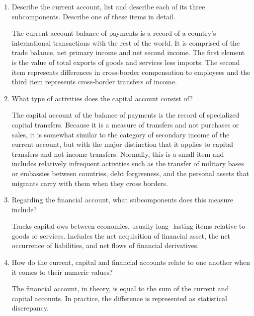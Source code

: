 \documentclass[12pt]{article}
\begin{document}
\begin{enumerate}[1)]
	
	\item Describe the current account, list and describe each of its three subcomponents. Describe one of these items in detail. 
	
	\vspace{0.2in}
	The current account balance of payments is a record of a country's international transactions with the rest of the world.
	It is comprised of the trade balance, net primary income and net second income.
	The first element is the value of total exports of goods and services less imports. 
	The second item represents differences in cross-border compensation to employees and the third item represents cross-border transfers of income. 
	\vspace{0.2in}
	
	\item What type of activities does the capital account consist of?
	
	\vspace{0.2in}
	The capital account of the balance of payments is the record of specialized capital transfers. Because it is a measure of transfers and not purchases or sales, it is somewhat similar to the category of secondary income of the current account, but with the major distinction that it applies to capital transfers and not income transfers. Normally, this is a small item and includes relatively infrequent activities such as the transfer of military bases or embassies between countries, debt forgiveness, and the personal assets that migrants carry with them when they cross borders.
	\vspace{0.2in}
	
	\item Regarding the financial account, what subcomponents does this measure include?
	
	\vspace{0.2in}
	Tracks capital ows between economies, usually long-
	lasting items relative to goods or services. Includes  the net acquisition of financial asset, the net occurrence of liabilities, and net flows of financial derivatives.
	\vspace{0.2in}
	
	\item How do the current, capital and financial accounts relate to one another when it comes to their numeric values?  
	
	\vspace{0.2in}
	The financial account, in theory, is equal to the sum of the current and capital accounts. In practice, the difference is represented as statistical discrepancy.
	\vspace{0.2in}
	

\end{enumerate}
\end{document}
